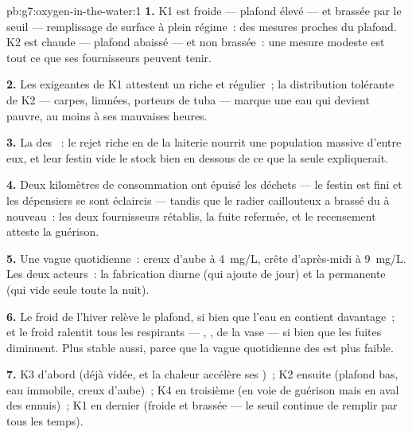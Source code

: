 \begin{solution}{pb:g7:oxygen-in-the-water:1}
\textbf{1.} K1 est froide --- plafond élevé --- et brassée par le
seuil --- remplissage de surface à plein régime~: des mesures
proches du plafond. K2 est chaude --- plafond abaissé --- et non
brassée~: une mesure modeste est tout ce que ses fournisseurs
peuvent tenir.

\textbf{2.} Les  exigeantes de K1 attestent un 
riche et régulier~; la distribution tolérante de K2 --- carpes,
limnées, porteurs de tuba --- marque une eau qui devient pauvre, au
moins à ses mauvaises heures.

\textbf{3.} La  des ~: le rejet riche en
 de la laiterie nourrit une population massive
d'entre eux, et leur festin vide le stock bien en dessous de ce que
la  seule expliquerait.

\textbf{4.} Deux kilomètres de consommation ont épuisé les déchets
--- le festin est fini et les dépensiers se sont éclaircis ---
tandis que le radier caillouteux a brassé du  à nouveau~:
les deux fournisseurs rétablis, la fuite refermée, et le recensement
atteste la guérison.

\textbf{5.} Une vague quotidienne~: creux d'aube à \qty{4}{mg/L},
crête d'après-midi à \qty{9}{mg/L}. Les deux acteurs~: la
fabrication diurne (qui ajoute de jour) et la 
permanente (qui vide seule toute la nuit).

\textbf{6.} Le froid de l'hiver relève le plafond, si bien que l'eau
en contient davantage~; et le froid ralentit tous les respirants ---
, ,  de la vase --- si bien que les
fuites diminuent. Plus stable aussi, parce que la vague quotidienne
des  est plus faible.

\textbf{7.} K3 d'abord (déjà vidée, et la chaleur accélère ses
)~; K2 ensuite (plafond bas, eau immobile, creux
d'aube)~; K4 en troisième (en voie de guérison mais en aval des
ennuis)~; K1 en dernier (froide et brassée --- le seuil continue de
remplir par tous les temps).


\end{solution}
